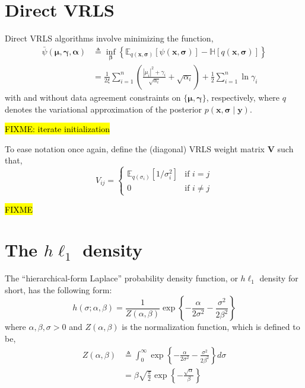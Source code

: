 \documentclass{article}
\newcommand{\m}[1]{\boldsymbol{#1}}
\newcommand{\E}[2]{\mathbb{E}_{#2}\left[ #1 \right]}
\newcommand{\entropy}[1]{\mathbb{H}\left[ #1 \right]}
\begin{document}
\section{Direct VRLS}
\label{s:vrls}
Direct VRLS algorithms involve minimizing the function,
\begin{equation}
\begin{aligned}
\bar\psi(\m{\mu}, \m{\gamma}, \m{\alpha}) &\triangleq
 \inf_{\m{\beta}} \left\{
  \E{\psi(\m{x}, \m{\sigma})}{q(\m{x}, \m{\sigma})} -
  \entropy{q(\m{x}, \m{\sigma})}
 \right\}
\\ &=
 \frac{1}{2 \xi} \sum_{i=1}^n \left(
  \frac{|\mu_i|^2 + \gamma_i}{\sqrt{\alpha_i}} + \sqrt{\alpha_i}
 \right) +
 \frac{1}{2} \sum_{i=1}^n \ln \gamma_i
\end{aligned}
\label{eq:psibar}
\end{equation}
with and without data agreement constraints on $\{\m{\mu}, \m{\gamma}\}$,
respectively, where $q$ denotes the variational approximation of the
posterior $p(\m{x}, \m{\sigma} \mid \m{y})$.

\hl{FIXME: iterate initialization}

To ease notation once again, define
the (diagonal) VRLS weight matrix $\m{V}$ such that,
\begin{equation}
V_{ij} = \begin{cases}
 \E{1 / \sigma_i^2}{q(\sigma_i)} &\text{if } i = j \\
 0 &\text{if } i \ne j
\end{cases}
\label{eq:vmatrix}
\end{equation}

\hl{FIXME}

\section{The $h\ell_1$ density}
\label{s:hprior}
The ``hierarchical-form Laplace'' probability density function,
or $h\ell_1$ density for short, has the following form:
\begin{equation}
h(\sigma; \alpha, \beta) =
 \frac{1}{Z(\alpha, \beta)}
 \exp\left\{
  -\frac{\alpha}{2 \sigma^2}
  -\frac{\sigma^2}{2 \beta^2}
 \right\}
\label{eq:hprior}
\end{equation}
where $\alpha, \beta, \sigma > 0$ and $Z(\alpha, \beta)$ is the
normalization function, which is defined to be,
\begin{equation}
\begin{aligned}
Z(\alpha, \beta) &\triangleq
 \int_0^\infty \exp\left\{
  -\frac{\alpha}{2 \sigma^2}
  -\frac{\sigma^2}{2 \beta^2}
 \right\} d\sigma
\\ &=
 \beta \sqrt{\frac{\pi}{2}}
 \exp\left\{ -\frac{\sqrt{\alpha}}{\beta} \right\}
\end{aligned}
\label{eq:hprior_z}
\end{equation}
\end{document}
